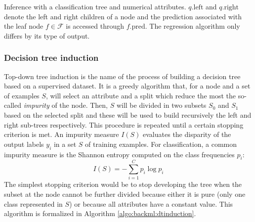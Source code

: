 \begin{algorithm}[t]
  \SetAlgoLined
  \caption{Inference with a classification tree and numerical attributes. $q.\text{left}$ and $q.\text{right}$ denote the left and right children of a node and the prediction associated with the leaf node $f \in \mathcal{F}$ is accessed through $f.\text{pred}$. The regression algorithm only differs by its type of output.}
  \label{algo:backml:dtinference}
\end{algorithm}

\subsubsection{Decision tree induction}
\label{sssec:backml:dtinduction}

Top-down tree induction is the name of the process of building a decision tree based on a supervised dataset. It is a greedy algorithm that, for a node and a set of examples $S$, will select an attribute and a split which reduce the most the so-called \textit{impurity} of the node. Then, $S$ will be divided in two subsets $S_0$ and $S_1$ based on the selected split and these will be used to build recursively the left and right sub-trees respectively. This procedure is repeated until a certain stopping criterion is met. An impurity measure $I(S)$ evaluates the disparity of the output labels $y_i$ in a set $S$ of training examples. For classification, a common impurity measure is the Shannon entropy computed on the class frequencies $p_i$:
\begin{equation}
\label{eqn:backml:shannon_entropy}
I(S) = - \sum_{i=1}^C p_i \log p_i
\end{equation}
The simplest stopping criterion would be to stop developing the tree when the subset at the node cannot be further divided because either it is pure (\eg only one class represented in $S$) or because all attributes have a constant value. This algorithm is formalized in Algorithm \ref{algo:backml:dtinduction}. 


